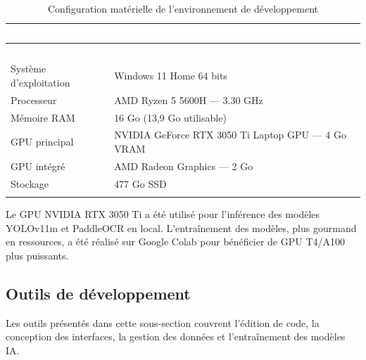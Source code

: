 \renewcommand{\arraystretch}{1.3}
\begin{longtable}{|p{5cm}|p{9.5cm}|}
  \rowcolor{bleu_principal}
  \textcolor{white}{\textbf{Composant}} & \textcolor{white}{\textbf{Détail}} \\
  \hline
  \endfirsthead
  \rowcolor{bleu_principal}
  \textcolor{white}{\textbf{Composant}} & \textcolor{white}{\textbf{Détail}} \\
  \hline
  \endhead
  Système d'exploitation & Windows 11 Home 64 bits \\ \hline
  Processeur             & AMD Ryzen 5 5600H --- 3.30 GHz \\ \hline
  Mémoire RAM            & 16 Go (13,9 Go utilisable) \\ \hline
  GPU principal          & NVIDIA GeForce RTX 3050 Ti Laptop GPU --- 4 Go VRAM \\ \hline
  GPU intégré            & AMD Radeon Graphics --- 2 Go \\ \hline
  Stockage               & 477 Go SSD \\ \hline
  \caption{Configuration matérielle de l'environnement de développement}
  \label{tab:ch6-env-materiel}
\end{longtable}

Le GPU NVIDIA RTX 3050 Ti a été utilisé pour l'inférence des modèles YOLOv11m et PaddleOCR en local. L'entraînement des modèles, plus gourmand en ressources, a été réalisé sur Google Colab pour bénéficier de GPU T4/A100 plus puissants.

\subsection{Outils de développement}
\label{subsec:outils-dev}

Les outils présentés dans cette sous-section couvrent l'édition de code, la conception des interfaces, la gestion des données et l'entraînement des modèles IA.

